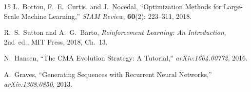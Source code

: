 \documentclass[12pt, a4paper]{article}
\begin{document}
\begin{thebibliography}{15}
L.~Bottou, F.~E.~Curtis, and J.~Nocedal,
\newblock ``Optimization Methods for Large-Scale Machine Learning,''
\newblock \textit{SIAM Review}, \textbf{60}(2): 223--311, 2018.

R.~S.~Sutton and A.~G.~Barto,
\newblock \textit{Reinforcement Learning: An Introduction}, 2nd~ed.,
\newblock MIT Press, 2018, Ch.~13.

N.~Hansen,
\newblock ``The CMA Evolution Strategy: A Tutorial,''
\newblock \textit{arXiv:1604.00772}, 2016.

A.~Graves,
\newblock ``Generating Sequences with Recurrent Neural Networks,''
\newblock \textit{arXiv:1308.0850}, 2013.

\end{thebibliography}
\end{document}
